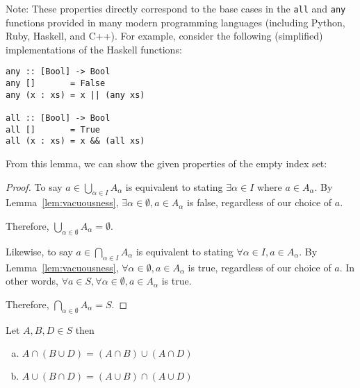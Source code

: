 Note: These properties directly correspond to the base cases in the \texttt{all} and \texttt{any} functions provided in many modern programming languages
(including Python, Ruby, Haskell, and C++). For example, consider the following (simplified) implementations of the Haskell functions:

\begin{verbatim}
any :: [Bool] -> Bool
any []       = False
any (x : xs) = x || (any xs)

all :: [Bool] -> Bool
all []       = True
all (x : xs) = x && (all xs)
\end{verbatim}

From this lemma, we can show the given properties of the empty index set:

\begin{proof}
	To say $a \in \bigcup_{\alpha \in I} A_\alpha$ is equivalent to stating $\exists \alpha \in I$ where $a \in A_\alpha$.
	By Lemma~\ref{lem:vacuousness}, $\exists \alpha \in \emptyset, a \in A_\alpha$ is false, regardless of our choice of $a$.

	Therefore, $\bigcup_{\alpha \in \emptyset} A_\alpha = \emptyset$.

	Likewise, to say $a \in \bigcap_{\alpha \in I} A_\alpha$ is equivalent to stating $\forall \alpha \in I, a \in A_\alpha$.
	By Lemma~\ref{lem:vacuousness}, $\forall \alpha \in \emptyset, a \in A_\alpha$ is true, regardless of our choice of $a$.
	In other words, $\forall a \in S, \forall \alpha \in \emptyset, a \in A_\alpha$ is true.

	Therefore, $\bigcap_{\alpha \in \emptyset} A_\alpha = S$.
\end{proof}

\begin{problem}[2]
	Let $A, B, D \in S$ then \\
	\begin{enumerate}[(a)]
		\item $A \cap (B \cup D) = (A \cap B) \cup (A \cap D)$
		\item $A \cup (B \cap D) = (A \cup B) \cap (A \cup D)$
	\end{enumerate}
\end{problem}

